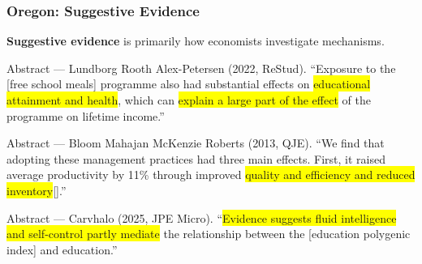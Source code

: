 \documentclass[dvipsnames,handout]{beamer} %
\begin{document}
\begin{frame}
    \frametitle{Oregon: Suggestive Evidence}
    \textbf{Suggestive evidence} is primarily how economists investigate mechanisms.

    \begin{block}{Abstract --- Lundborg Rooth Alex-Petersen (2022, ReStud).} 
        ``\textellipsis Exposure to the [free school meals] programme also had substantial effects on \colorbox{yellow}{educational attainment and health}, which can \colorbox{yellow}{explain a large part of the effect} of the programme on lifetime income.''
    \end{block}

    \begin{block}{Abstract --- Bloom Mahajan McKenzie Roberts (2013, QJE).} 
        ``\textellipsis We find that adopting these
        management practices had three main effects. First, it raised average productivity by 11\% through improved 
        \colorbox{yellow}{quality and efficiency and reduced inventory}[\textellipsis].''
    \end{block}

    \begin{block}{Abstract --- Carvhalo (2025, JPE Micro).} 
        ``\textellipsis \colorbox{yellow}{Evidence suggests fluid intelligence and self-control partly mediate} the relationship between the [education polygenic index] and education.''
    \end{block}
\end{frame}
\end{document}

